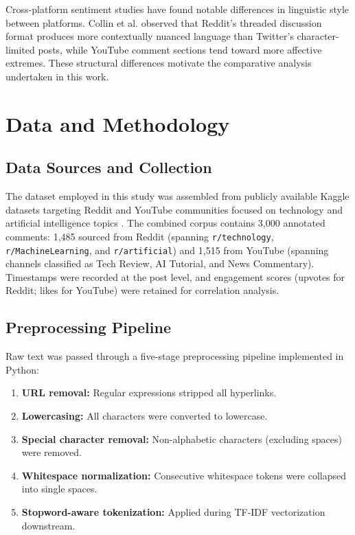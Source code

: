 \documentclass[conference]{IEEEtran}
\begin{document}
Cross-platform sentiment studies have found notable differences in linguistic
style between platforms. Collin et al. \cite{twitter_reddit_compare} observed
that Reddit's threaded discussion format produces more contextually nuanced
language than Twitter's character-limited posts, while YouTube comment sections
tend toward more affective extremes. These structural differences motivate the
comparative analysis undertaken in this work.

\section{Data and Methodology}

\subsection{Data Sources and Collection}

The dataset employed in this study was assembled from publicly available
Kaggle datasets targeting Reddit and YouTube communities focused on
technology and artificial intelligence topics \cite{kaggle_yt_1m,
kaggle_yt_us, kaggle_yt_tox, kaggle_reddit_sent, kaggle_twitter_reddit}.
The combined corpus contains 3{,}000 annotated comments: 1{,}485 sourced
from Reddit (spanning \texttt{r/technology}, \texttt{r/MachineLearning}, and
\texttt{r/artificial}) and 1{,}515 from YouTube (spanning channels classified
as Tech Review, AI Tutorial, and News Commentary). Timestamps were recorded
at the post level, and engagement scores (upvotes for Reddit; likes for
YouTube) were retained for correlation analysis.

\subsection{Preprocessing Pipeline}

Raw text was passed through a five-stage preprocessing pipeline implemented
in Python:
\begin{enumerate}
  \item \textbf{URL removal:} Regular expressions stripped all hyperlinks.
  \item \textbf{Lowercasing:} All characters were converted to lowercase.
  \item \textbf{Special character removal:} Non-alphabetic characters
        (excluding spaces) were removed.
  \item \textbf{Whitespace normalization:} Consecutive whitespace tokens
        were collapsed into single spaces.
  \item \textbf{Stopword-aware tokenization:} Applied during TF-IDF
        vectorization downstream.
\end{enumerate}
\end{document}
